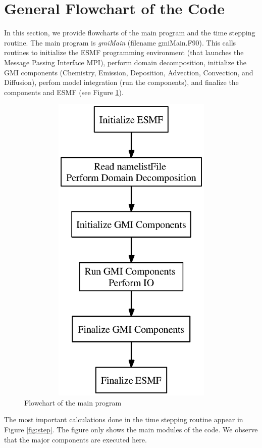 \section{General Flowchart of the Code}
%
In this section, we provide flowcharts of the main program and the time stepping
routine. 
The main program is {\em gmiMain} (filename gmiMain.F90).
This calls routines to initialize the ESMF programming environment
(that launches the Message Passing Interface MPI),  perform domain decomposition, 
initialize the GMI
components (Chemistry, Emission, Deposition, Advection, Convection, and Diffusion),
perfom model integration (run the components), and finalize the components
and ESMF (see Figure \ref{fig:main}).
%
%
%
\begin{figure}[hbtp]
\centering                                             %
\includegraphics[height=6.0in,width=6.0in]{gmiMainFlowchart.ps}
\caption{Flowchart of the main program} 
\label{fig:main}
\end{figure}
%
The most important calculations done in the time stepping routine appear in
Figure \ref{fig:step}.
The figure only shows the main modules of the code.
We observe that the major components are executed here.
